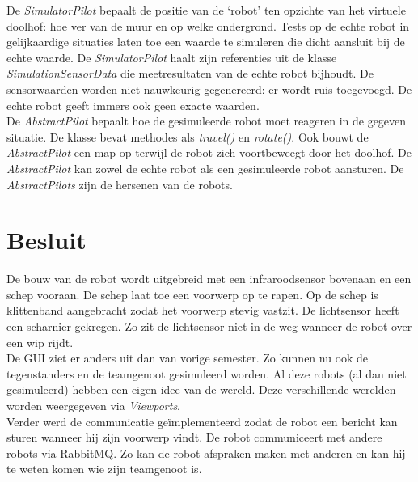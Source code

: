 \documentclass[tt1]{penoverslag}
\begin{document}
De \textit{SimulatorPilot} bepaalt de positie van de `robot' ten opzichte van het virtuele doolhof: hoe ver van de muur en op welke ondergrond. Tests op de echte robot in gelijkaardige situaties laten toe een waarde te simuleren die dicht aansluit bij de echte waarde. De \textit{SimulatorPilot} haalt zijn referenties uit de klasse \textit{SimulationSensorData} die meetresultaten van de echte robot bijhoudt. De sensorwaarden worden niet nauwkeurig gegenereerd: er wordt ruis toegevoegd. De echte robot geeft immers ook geen exacte waarden.\\

De \textit{AbstractPilot} bepaalt hoe de gesimuleerde robot moet reageren in de gegeven situatie. De klasse bevat methodes als \textit{travel()} en \textit{rotate()}. Ook bouwt de \textit{AbstractPilot} een map op terwijl de robot zich voortbeweegt door het doolhof. De \textit{AbstractPilot} kan zowel de echte robot als een gesimuleerde robot aansturen. De \textit{AbstractPilots} zijn de hersenen van de robots.


\section{Besluit}
De bouw van de robot wordt uitgebreid met een infraroodsensor bovenaan en een schep vooraan. De schep laat toe een voorwerp op te rapen. Op de schep is klittenband aangebracht zodat het voorwerp stevig vastzit. De lichtsensor heeft een scharnier gekregen. Zo zit de lichtsensor niet in de weg wanneer de robot over een wip rijdt. \\

De GUI ziet er anders uit dan van vorige semester. Zo kunnen nu ook de tegenstanders en de teamgenoot gesimuleerd worden. Al deze robots (al dan niet gesimuleerd) hebben een eigen idee van de wereld. Deze verschillende werelden worden weergegeven via \textit{Viewports}.\\

Verder werd de communicatie ge\"implementeerd zodat de robot een bericht kan sturen wanneer hij zijn voorwerp vindt. 
De robot communiceert met andere robots via RabbitMQ. Zo kan de robot afspraken maken met anderen en kan hij te weten komen wie zijn teamgenoot is.
 
\end{document}
